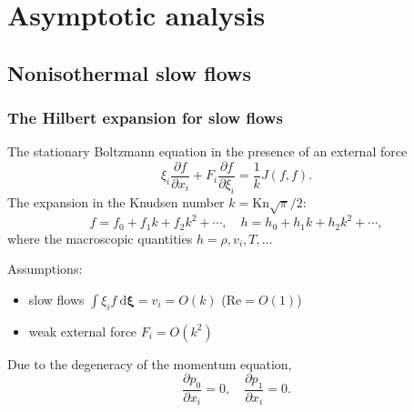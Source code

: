 \documentclass[mathserif]{beamer} %
\newcommand{\Kn}{\mathrm{Kn}}
\newcommand{\dd}{\:\mathrm{d}}
\newcommand{\pder}[2][]{\frac{\partial#1}{\partial#2}}
\newcommand{\dxi}{\boldsymbol{\dd\xi}}
\newcommand{\OO}[1]{O(#1)}
\begin{document}
\section{Asymptotic analysis}
\subsection{Nonisothermal slow flows}

\begin{frame}
    \frametitle{The Hilbert expansion for slow flows}
    The stationary Boltzmann equation in the presence of an external force
    \begin{equation}\label{eq:Boltzmann}
        \xi_i\pder[f]{x_i} + F_i\pder[f]{\xi_i} = \frac1k J(f,f).
    \end{equation}
    The expansion in the Knudsen number \(k=\Kn\sqrt\pi/2\):
    \begin{equation}\label{eq:expansion}
        f = f_0 + f_1k + f_2k^2 + \cdots, \quad h = h_0 + h_1k + h_2k^2 + \cdots,
    \end{equation}
    where the macroscopic quantities \(h = \rho, v_i, T, \dots\)
    \vspace{5pt}\pause

    Assumptions:
    \begin{itemize}
        \item slow flows \(\int\xi_i f\dxi = v_i = \OO{k}\) (\(\mathrm{Re} = \OO{1}\))
        \item weak external force \(F_i = \OO{k^2}\)
    \end{itemize}
    Due to the degeneracy of the momentum equation,
    \begin{equation}
        \pder[p_0]{x_i} = 0, \quad \pder[p_1]{x_i} = 0.
    \end{equation}
\end{frame}
\end{document}
